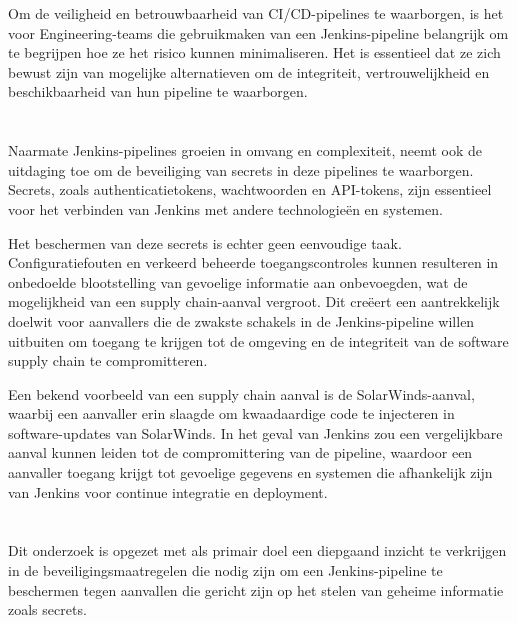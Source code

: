 Om de veiligheid en betrouwbaarheid van CI/CD-pipelines te waarborgen, is het voor Engineering-teams die gebruikmaken van een Jenkins-pipeline belangrijk om te begrijpen hoe ze het risico kunnen minimaliseren. Het is essentieel dat ze zich bewust zijn van mogelijke alternatieven om de integriteit, vertrouwelijkheid en beschikbaarheid van hun pipeline te waarborgen.

\section{}%
\label{sec:probleemstelling}

Naarmate Jenkins-pipelines groeien in omvang en complexiteit, neemt ook de uitdaging toe om de beveiliging van secrets in deze pipelines te waarborgen. Secrets, zoals authenticatietokens, wachtwoorden en API-tokens, zijn essentieel voor het verbinden van Jenkins met andere technologieën en systemen.
\newline

Het beschermen van deze secrets is echter geen eenvoudige taak. Configuratiefouten en verkeerd beheerde toegangscontroles kunnen resulteren in onbedoelde blootstelling van gevoelige informatie aan onbevoegden, wat de mogelijkheid van een supply chain-aanval vergroot. Dit creëert een aantrekkelijk doelwit voor aanvallers die de zwakste schakels in de Jenkins-pipeline willen uitbuiten om toegang te krijgen tot de omgeving en de integriteit van de software supply chain te compromitteren.
\newline

Een bekend voorbeeld van een supply chain aanval is de SolarWinds-aanval, \mbox{waarbij} een aanvaller erin slaagde om kwaadaardige code te injecteren in software-updates van SolarWinds. \autocite{Paganini2021} In het geval van Jenkins zou een vergelijkbare aanval kunnen leiden tot de compromittering van de pipeline, waardoor een aanvaller toegang krijgt tot gevoelige gegevens en systemen die afhankelijk zijn van Jenkins voor continue integratie en deployment.
\clearpage

\section{}%
\label{sec:onderzoeksvraag}

Dit onderzoek is opgezet met als primair doel een diepgaand inzicht te verkrijgen in de beveiligingsmaatregelen die nodig zijn om een Jenkins-pipeline te beschermen tegen aanvallen die gericht zijn op het stelen van geheime informatie zoals secrets.
\newline


